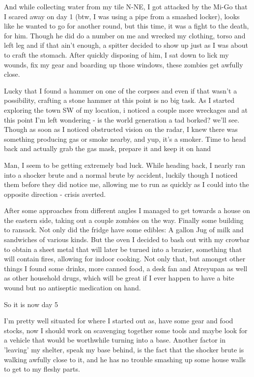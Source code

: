\documentclass[11pt]{report}
\begin{document}
And while collecting water from my tile N-NE, I got attacked by the Mi-Go that I scared away on day 1 (btw, I was using a pipe from a smashed locker), looks like he wanted to go for another round, but this time, it was a fight to the death, for him. Though he did do a number on me and wrecked my clothing, torso and left leg and if that ain't enough, a spitter decided to show up just as I was about to craft the stomach. After quickly disposing of him, I sat down to lick my wounds, fix my gear and boarding up those windows, these zombies get awfully close.

Lucky that I found a hammer on one of the corpses and even if that wasn't a possibility, crafting a stone hammer at this point is no big task. As I started exploring the town SW of my location, i noticed a couple more wreckages and at this point I'm left wondering - is the world generation a tad borked? we'll see. Though as soon as I noticed obstructed vision on the radar, I knew there was something producing gas or smoke nearby, and yup, it's a smoker. Time to head back and actually grab the gas mask, prepare it and keep it on hand

Man, I seem to be getting extremely bad luck. While heading back, I nearly ran into a shocker brute and a normal brute by accident, luckily though I noticed them before they did notice me, allowing me to run as quickly as I could into the opposite direction - crisis averted.

After some approaches from different angles I managed to get towards a house on the eastern side, taking out a couple zombies on the way. Finally some building to ransack. Not only did the fridge have some edibles: A gallon Jug of milk and sandwiches of various kinds. But the oven I decided to bash out with my crowbar to obtain a sheet metal that will later be turned into a brazier, something that will contain fires, allowing for indoor cooking. Not only that, but amongst other things I found some drinks, more canned food, a desk fan and Atreyupan as well as other household drugs, which will be great if I ever happen to have a bite wound but no antiseptic medication on hand.

So it is now day 5

I'm pretty well situated for where I started out as, have some gear and food stocks, now I should work on scavenging together some tools and maybe look for a vehicle that would be worthwhile turning into a base.
Another factor in 'leaving' my shelter, speak my base behind, is the fact that the shocker brute is walking awfully close to it, and he has no trouble smashing up some house walls to get to my fleshy parts.
\end{document}
